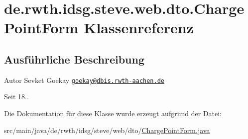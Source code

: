 \hypertarget{classde_1_1rwth_1_1idsg_1_1steve_1_1web_1_1dto_1_1_charge_point_form}{\section{de.\+rwth.\+idsg.\+steve.\+web.\+dto.\+Charge\+Point\+Form Klassenreferenz}
\label{classde_1_1rwth_1_1idsg_1_1steve_1_1web_1_1dto_1_1_charge_point_form}
}


\subsection{Ausführliche Beschreibung}
\begin{DoxyAuthor}{Autor}
Sevket Goekay \href{mailto:goekay@dbis.rwth-aachen.de}{\tt goekay@dbis.\+rwth-\/aachen.\+de} 
\end{DoxyAuthor}
\begin{DoxySince}{Seit}
18.. 
\end{DoxySince}


Die Dokumentation für diese Klasse wurde erzeugt aufgrund der Datei\+:\begin{DoxyCompactItemize}
\item 
src/main/java/de/rwth/idsg/steve/web/dto/\hyperlink{_charge_point_form_8java}{Charge\+Point\+Form.\+java}\end{DoxyCompactItemize}
